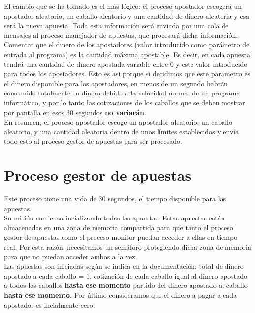 \documentclass[12pt]{article}
\begin{document}
El cambio que se ha tomado es el más lógico: el proceso apostador escogerá un apostador aleatorio, un caballo aleatorio y una cantidad de dinero aleatoria y esa será la nueva apuesta. Toda esta información será enviada por una cola de mensajes al proceso manejador de apuestas, que procesará dicha información.\\

Comentar que el dinero de los apostadores (valor introducido como parámetro de entrada al programa) es la cantidad máxima apostable. Es decir, en cada apuesta tendrá una cantidad de dinero apostada variable entre 0 y este valor introducido para todos los apostadores. Esto es así porque si decidimos que este parámetro es el dinero disponible para los apostadores, en menos de un segundo habrán consumido totalmente su dinero debido a la velocidad normal de un programa informático, y por lo tanto las cotizaciones de los caballos que se deben mostrar por pantalla en esos 30 segundos \textbf{no variarán}.\\

En resumen, el proceso apostador escoge un apostador aleatorio, un caballo aleatorio, y una cantidad aleatoria dentro de unos límites establecidos y envía todo esto al proceso gestor de apuestas para ser procesado.\\

\section{Proceso gestor de apuestas}
Este proceso tiene una vida de 30 segundos, el tiempo disponible para las apuestas.\\

Su misión comienza incializando todas las apuestas. Estas apuestas están almacenadas en una zona de memoria compartida para que tanto el proceso gestor de apuestas como el proceso monitor puedan acceder a ellas en tiempo real. Por esta razón, necesitamos un semáforo protegiendo dicha zona de memoria para que no puedan acceder ambos a la vez.\\

Las apuestas son iniciadas según se indica en la documentación: total de dinero apostado a cada caballo = 1, cotización de cada caballo igual al dinero apostado a todos los caballos \textbf{hasta ese momento} partido del dinero apostado al caballo \textbf{hasta ese momento}. Por último consideramos que el dinero a pagar a cada apostador es incialmente cero.\\
\end{document}
